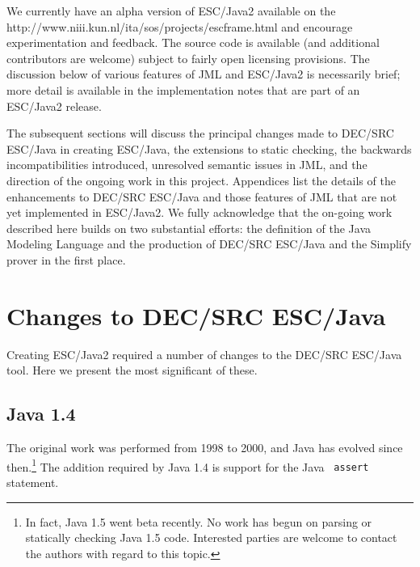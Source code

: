 \documentclass{article}
\begin{document}
We currently have an alpha version of ESC/Java2 available on the
{http://www.niii.kun.nl/ita/sos/projects/escframe.html} and encourage
experimentation and feedback.  The source code is available
(and additional contributors are welcome) subject to fairly open
licensing provisions.  The discussion below of various features of JML
and ESC/Java2 is necessarily brief; more detail is available in the
implementation notes that are part of an ESC/Java2 release.

The subsequent sections will discuss the principal changes made to
DEC/SRC ESC/Java in creating ESC/Java, the extensions to
static checking, the backwards incompatibilities introduced,
unresolved semantic issues in JML, and the direction of the ongoing work
in this project.  Appendices list the details of the enhancements to
DEC/SRC ESC/Java and those features of JML
that are not yet implemented in ESC/Java2.  We fully acknowledge that
the on-going work described here builds on two substantial efforts:
the definition of the Java Modeling
Language
and
the production of DEC/SRC ESC/Java and the Simplify prover in
the first place.


\section{Changes to DEC/SRC ESC/Java}

Creating ESC/Java2 required a number of changes to the DEC/SRC
ESC/Java tool.  Here we present the most significant
of these.
\subsection{Java 1.4}
The original work was performed from 1998 to 2000, and Java has evolved
since then.\footnote{In fact, Java 1.5 went beta recently.  No work has begun on
  parsing or statically checking Java 1.5 code.  Interested parties
  are welcome to contact the authors with regard to this topic.}  The
addition required by Java 1.4 is support for the Java {\tt
  assert} statement.  

\end{document}
